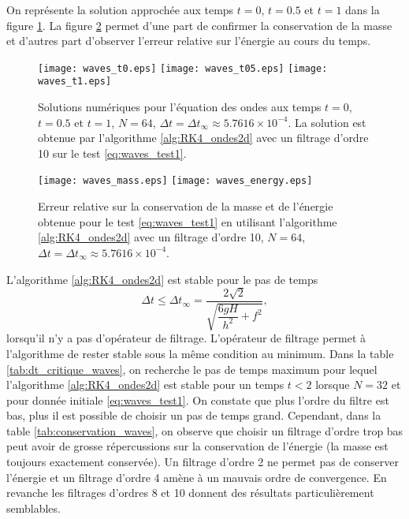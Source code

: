 On représente la solution approchée aux temps $t=0$, $t=0.5$ et $t=1$ dans la figure \ref{fig:waves_solution}. La figure \ref{fig:waves_conservation} permet d'une part de confirmer la conservation de la masse et d'autres part d'observer l'erreur relative sur l'énergie au cours du temps.
\begin{figure}[htbp]
\begin{center}
\texttt{[image: waves\_t0.eps]}
\texttt{[image: waves\_t05.eps]}
\texttt{[image: waves\_t1.eps]}
\end{center}
\caption{Solutions numériques pour l'équation des ondes aux temps $t=0$, $t=0.5$ et $t=1$, $N=64$, $\Delta t=\Delta t_{\infty} \approx 5.7616\times10^{-4}$. La solution est obtenue par l'algorithme \ref{alg:RK4_ondes2d} avec un filtrage d'ordre 10 sur le test \eqref{eq:waves_test1}.}
\label{fig:waves_solution}
\end{figure}
\begin{figure}[htbp]
\begin{center}
\texttt{[image: waves\_mass.eps]}
\texttt{[image: waves\_energy.eps]}
\end{center}
\caption{Erreur relative sur la conservation de la masse et de l'énergie obtenue pour le test \ref{eq:waves_test1} en utilisant l'algorithme \ref{alg:RK4_ondes2d} avec un filtrage d'ordre 10, $N=64$, $\Delta t=\Delta t_{\infty} \approx 5.7616\times10^{-4}$.}
\label{fig:waves_conservation}
\end{figure}
L'algorithme \ref{alg:RK4_ondes2d} est stable pour le pas de temps
\begin{equation}
\Delta t \leq \Delta t_{\infty} = \dfrac{2 \sqrt{2}}{\sqrt{\dfrac{6 g H}{h^2} + f^2}},
\end{equation}
lorsqu'il n'y a pas d'opérateur de filtrage. L'opérateur de filtrage permet à l'algorithme de rester stable sous la même condition au minimum. Dans la table \ref{tab:dt_critique_waves}, on recherche le pas de temps maximum pour lequel l'algorithme \ref{alg:RK4_ondes2d} est stable pour un temps $t<2$ lorsque $N=32$ et pour donnée initiale \eqref{eq:waves_test1}. On constate que plus l'ordre du filtre est bas, plus il est possible de choisir un pas de temps grand. Cependant, dans la table \ref{tab:conservation_waves}, on observe que choisir un filtrage d'ordre trop bas peut avoir de grosse répercussions sur la conservation de l'énergie (la masse est toujours exactement conservée). Un filtrage d'ordre 2 ne permet pas de conserver l'énergie et un filtrage d'ordre 4 amène à un mauvais ordre de convergence. En revanche les filtrages d'ordres 8 et 10 donnent des résultats particulièrement semblables.

